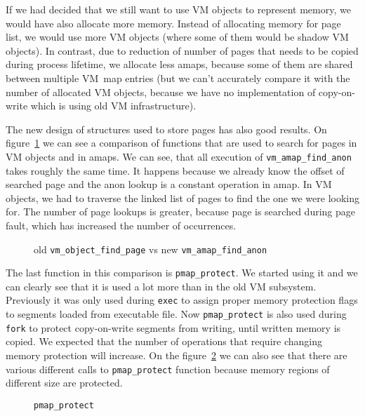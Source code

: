 If we had decided that we still want to use VM objects to represent memory, we would have also allocate more memory.
Instead of allocating memory for page list, we would use more VM objects (where some of them would be shadow VM objects).
In contrast, due to reduction of number of pages that needs to be copied during process lifetime, we allocate less amaps,
because some of them are shared between multiple VM~map entries (but we can't accurately compare it with the number of allocated VM objects,
because we have no implementation of copy-on-write which is using old VM infrastructure).


The new design of structures used to store pages has also good results.
On figure~\ref{histogram:find_page} we can see a comparison of functions that are used to search for pages in VM objects and in amaps.
We can see, that all execution of \texttt{vm_amap_find_anon} takes roughly the same time.
It happens because we already know the offset of searched page and the anon lookup is a constant operation in amap.
In VM objects, we had to traverse the linked list of pages to find the one we were looking for.
The number of page lookups is greater, because page is searched during page fault, which has increased the number of occurrences.

\begin{figure}[h]
  \centering
  \caption{old \texttt{vm_object_find_page} vs new \texttt{vm_amap_find_anon}}
  \label{histogram:find_page}
\end{figure}

The last function in this comparison is \texttt{pmap_protect}.
We started using it and we can clearly see that it is used a lot more than in the old VM subsystem.
Previously it was only used during {\tt exec} to assign proper memory protection flags to segments loaded from executable file.
Now \texttt{pmap_protect} is also used during {\tt fork} to protect copy-on-write segments from writing, until written memory is copied.
We expected that the number of operations that require changing memory protection will increase.
On the figure~\ref{histogram:pmap_protect} we can also see that there are various different calls to \texttt{pmap_protect} function
because memory regions of different size are protected.

\begin{figure}[h]
  \centering
  \caption{\texttt{pmap_protect}}
  \label{histogram:pmap_protect}
\end{figure}

